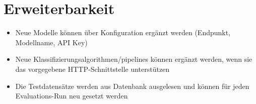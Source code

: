 \section{Erweiterbarkeit}\label{sec:erweiterbarkeit}

\begin{itemize}
    \item Neue Modelle können über Konfiguration ergänzt werden (Endpunkt, Modellname, API Key)
    \item Neue Klassifizierungsalgorithmen/pipelines können ergänzt werden, wenn sie das vorgegebene HTTP-Schnittstelle unterstützen
    \item Die Testdatensätze werden aus Datenbank ausgelesen und können für jeden Evaluations-Run neu gesetzt werden
\end{itemize}